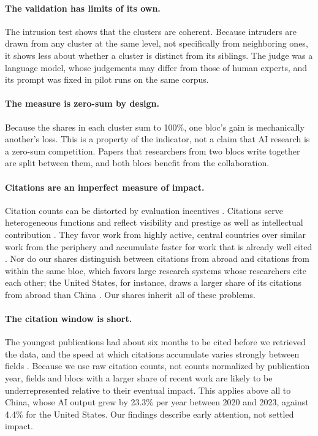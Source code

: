 \documentclass[10pt,twocolumn,a4paper]{article}
\begin{document}
	\paragraph{The validation has limits of its own.} The intrusion test shows that the clusters are coherent. Because intruders are drawn from any cluster at the same level, not specifically from neighboring ones, it shows less about whether a cluster is distinct from its siblings. The judge was a language model, whose judgements may differ from those of human experts, and its prompt was fixed in pilot runs on the same corpus.
	
	\paragraph{The measure is zero-sum by design.} Because the shares in each cluster sum to 100\%, one bloc's gain is mechanically another's loss. This is a property of the indicator, not a claim that AI research is a zero-sum competition. Papers that researchers from two blocs write together are split between them, and both blocs benefit from the collaboration.
	
	\paragraph{Citations are an imperfect measure of impact.} Citation counts can be distorted by evaluation incentives \parencite{baccini2019citation,fire2018over}. Citations serve heterogeneous functions \parencite{adler2009citation,bornmann2008what} and reflect visibility and prestige as well as intellectual contribution \parencite{waltman2016review}. They favor work from highly active, central countries over similar work from the periphery \parencite{gomez2022leading} and accumulate faster for work that is already well cited \parencite{Merton1968,lariviere2009impact,wang2013quantifying}. Nor do our shares distinguish between citations from abroad and citations from within the same bloc, which favors large research systems whose researchers cite each other; the United States, for instance, draws a larger share of its citations from abroad than China \parencite{min2026has}. Our shares inherit all of these problems.
	
	\paragraph{The citation window is short.} The youngest publications had about six months to be cited before we retrieved the data, and the speed at which citations accumulate varies strongly between fields \parencite{wang2013citation}. Because we use raw citation counts, not counts normalized by publication year, fields and blocs with a larger share of recent work are likely to be underrepresented relative to their eventual impact. This applies above all to China, whose AI output grew by 23.3\% per year between 2020 and 2023, against 4.4\% for the United States. Our findings describe early attention, not settled impact.
	
\end{document}
